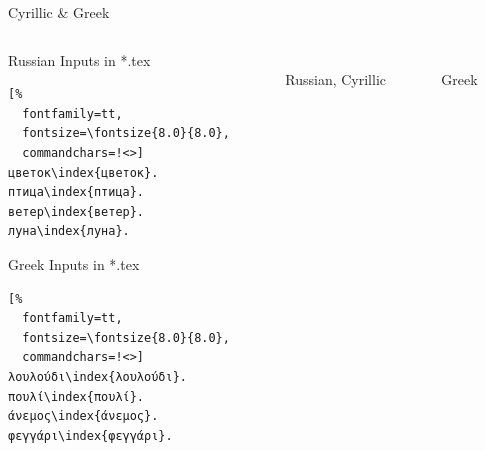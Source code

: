 \documentclass[aspectratio=169,10pt]{beamer}
\begin{document}
\begin{frame}[fragile]{Cyrillic \& Greek}

\begin{columns}
\begin{column}{46mm}

\setmonofont{Noto Sans Mono}
\begin{exampleblock}{Russian Inputs in *.tex}
\begin{Verbatim}[%
  fontfamily=tt,
  fontsize=\fontsize{8.0}{8.0},
  commandchars=!<>]
цветок\index{цветок}.
птица\index{птица}.
ветер\index{ветер}.
луна\index{луна}.
\end{Verbatim}
\end{exampleblock}

\begin{exampleblock}{Greek Inputs in *.tex}
\begin{Verbatim}[%
  fontfamily=tt,
  fontsize=\fontsize{8.0}{8.0},
  commandchars=!<>]
λουλούδι\index{λουλούδι}.
πουλί\index{πουλί}.
άνεμος\index{άνεμος}.
φεγγάρι\index{φεγγάρι}.
\end{Verbatim}
\end{exampleblock}
\end{column}

\begin{column}{43mm}
\begin{center}
\\[2mm]%
Russian, Cyrillic
\end{center}
\end{column}

\begin{column}{38mm}
\begin{center}
\\[2mm]%
Greek
\end{center}
\end{column}
\end{columns}

\end{frame}

\end{document}
